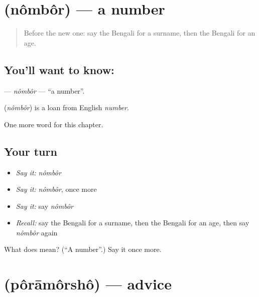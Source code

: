 \section[\texorpdfstring{\bn{নম্বর} (nômbôr)}{নম্বর (nômbôr)}]{ (nômbôr) — a number}

\label{lesson:BN-C227-nombor}



\begin{quote}
Before the new one: say the Bengali for a surname, then the Bengali for an age.
\end{quote}

\subsection*{You'll want to know: }
\textbf{} — \emph{nômbôr} — \textquotedblleft{}a number\textquotedblright{}.

\begin{cousinweb}
\textbf{} (\emph{nômbôr}) is a loan from English \emph{number}.
\end{cousinweb}

\begin{grammarlens}[title={What you've built}]
One more word for this chapter.
\end{grammarlens}

\subsection*{Your turn}
\begin{itemize}
\raggedright
  \item \emph{Say it:} \emph{nômbôr}
  \item \emph{Say it:} \emph{nômbôr}, once more
  \item \emph{Say it:} say \emph{nômbôr}
  \item \emph{Recall:} say the Bengali for a surname, then the Bengali for an age, then say \emph{nômbôr} again
\end{itemize}

\begin{tcolorbox}[breakable,colback=teal!4,colframe=teal!35!black,title={Before you move on}]
What does  mean? (\textquotedblleft{}A number\textquotedblright{}.) Say it once more.
\end{tcolorbox}
\section[\texorpdfstring{\bn{পরামর্শ} (pôrāmôrshô)}{পরামর্শ (pôrāmôrshô)}]{ (pôrāmôrshô) — advice}

